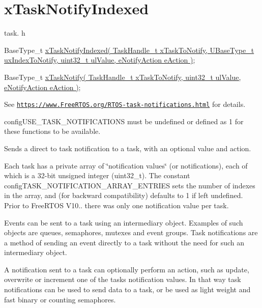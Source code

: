 \hypertarget{group__x_task_notify_indexed}{}\section{x\+Task\+Notify\+Indexed}
\label{group__x_task_notify_indexed}
task. h 
\begin{DoxyPre}BaseType\_t \hyperlink{externals_2freertos_2include_2task_8h_a0261e3cca34893bdfccbca1be2de93d5}{xTaskNotifyIndexed( TaskHandle\_t xTaskToNotify, UBaseType\_t uxIndexToNotify, uint32\_t ulValue, eNotifyAction eAction )};\end{DoxyPre}
 
\begin{DoxyPre}BaseType\_t \hyperlink{externals_2freertos_2include_2task_8h_a0d2d54fb8a64011dfbb54983e4ed06bd}{xTaskNotify( TaskHandle\_t xTaskToNotify, uint32\_t ulValue, eNotifyAction eAction )};\end{DoxyPre}


See \href{https://www.FreeRTOS.org/RTOS-task-notifications.html}{\tt https\+://www.\+Free\+R\+T\+O\+S.\+org/\+R\+T\+O\+S-\/task-\/notifications.\+html} for details.

config\+U\+S\+E\+\_\+\+T\+A\+S\+K\+\_\+\+N\+O\+T\+I\+F\+I\+C\+A\+T\+I\+O\+NS must be undefined or defined as 1 for these functions to be available.

Sends a direct to task notification to a task, with an optional value and action.

Each task has a private array of \char`\"{}notification values\char`\"{} (or \textquotesingle{}notifications\textquotesingle{}), each of which is a 32-\/bit unsigned integer (uint32\+\_\+t). The constant config\+T\+A\+S\+K\+\_\+\+N\+O\+T\+I\+F\+I\+C\+A\+T\+I\+O\+N\+\_\+\+A\+R\+R\+A\+Y\+\_\+\+E\+N\+T\+R\+I\+ES sets the number of indexes in the array, and (for backward compatibility) defaults to 1 if left undefined. Prior to Free\+R\+T\+OS V10.. there was only one notification value per task.

Events can be sent to a task using an intermediary object. Examples of such objects are queues, semaphores, mutexes and event groups. Task notifications are a method of sending an event directly to a task without the need for such an intermediary object.

A notification sent to a task can optionally perform an action, such as update, overwrite or increment one of the task\textquotesingle{}s notification values. In that way task notifications can be used to send data to a task, or be used as light weight and fast binary or counting semaphores.

